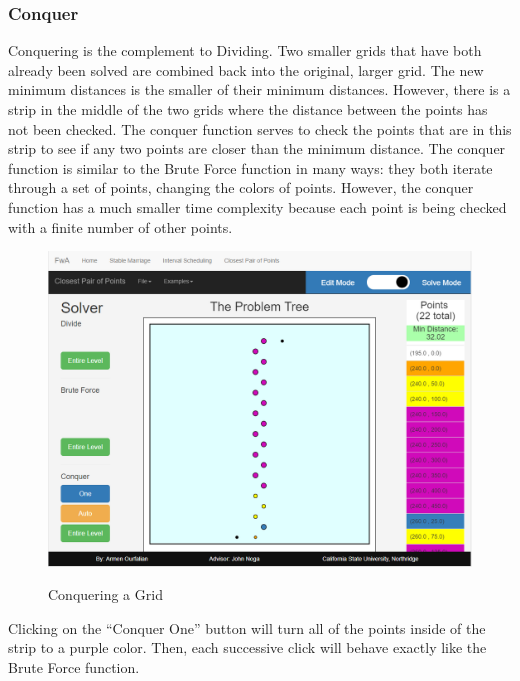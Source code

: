 \subsubsection{Conquer}
\hspace{-0.3in}
Conquering is the complement to Dividing. 
Two smaller grids that have both already been solved
are combined back into the original, larger grid. 
The new minimum distances is the smaller of their minimum distances. 
However, there is a strip in the middle of the two grids where 
the distance between the points has not been checked. 
The conquer function serves to check the points that are in this strip
to see if any two points are closer than the minimum distance. 
\newline\newline
The conquer function is similar to the Brute Force function in many ways: 
they both iterate through a set of points, 
changing the colors of points. 
However, the conquer function has a much smaller time complexity 
because each point is being checked with a finite number of other points. 
\newline\newline
\begin{figure}[H]
	\caption{Conquering a Grid}
	\includegraphics[width=\linewidth]
	{images/closest-pair-of-points/cpop-conquer.png}
	\label{fig-cpop-conquer}
	\centering
\end{figure}
\hspace{-0.3in}
Clicking on the ``Conquer One'' button will turn all of the points
inside of the strip to a purple color. Then, each successive click 
will behave exactly like the Brute Force function. 
